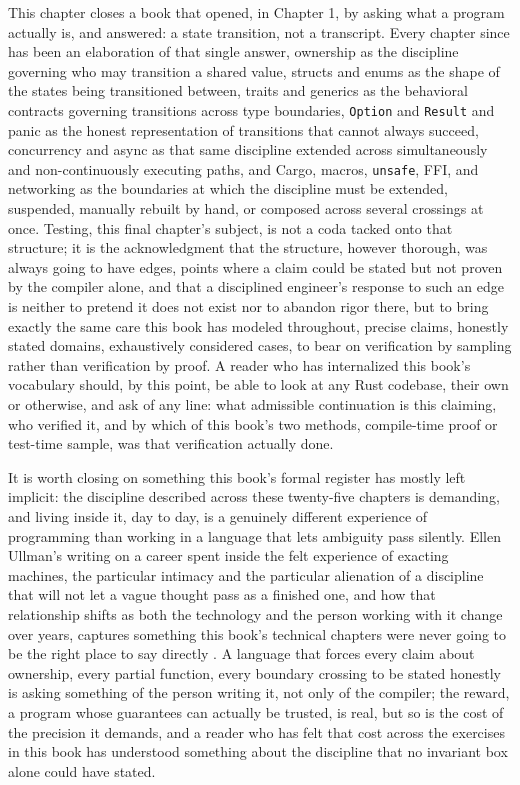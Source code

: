 \documentclass[11pt]{book}
\begin{document}
This chapter closes a book that opened, in Chapter 1, by asking what a program actually is, and answered: a state transition, not a transcript. Every chapter since has been an elaboration of that single answer, ownership as the discipline governing who may transition a shared value, structs and enums as the shape of the states being transitioned between, traits and generics as the behavioral contracts governing transitions across type boundaries, \texttt{Option} and \texttt{Result} and panic as the honest representation of transitions that cannot always succeed, concurrency and async as that same discipline extended across simultaneously and non-continuously executing paths, and Cargo, macros, \texttt{unsafe}, FFI, and networking as the boundaries at which the discipline must be extended, suspended, manually rebuilt by hand, or composed across several crossings at once. Testing, this final chapter's subject, is not a coda tacked onto that structure; it is the acknowledgment that the structure, however thorough, was always going to have edges, points where a claim could be stated but not proven by the compiler alone, and that a disciplined engineer's response to such an edge is neither to pretend it does not exist nor to abandon rigor there, but to bring exactly the same care this book has modeled throughout, precise claims, honestly stated domains, exhaustively considered cases, to bear on verification by sampling rather than verification by proof. A reader who has internalized this book's vocabulary should, by this point, be able to look at any Rust codebase, their own or otherwise, and ask of any line: what admissible continuation is this claiming, who verified it, and by which of this book's two methods, compile-time proof or test-time sample, was that verification actually done.

It is worth closing on something this book's formal register has mostly left implicit: the discipline described across these twenty-five chapters is demanding, and living inside it, day to day, is a genuinely different experience of programming than working in a language that lets ambiguity pass silently. Ellen Ullman's writing on a career spent inside the felt experience of exacting machines, the particular intimacy and the particular alienation of a discipline that will not let a vague thought pass as a finished one, and how that relationship shifts as both the technology and the person working with it change over years, captures something this book's technical chapters were never going to be the right place to say directly \cite{ullman2017}. A language that forces every claim about ownership, every partial function, every boundary crossing to be stated honestly is asking something of the person writing it, not only of the compiler; the reward, a program whose guarantees can actually be trusted, is real, but so is the cost of the precision it demands, and a reader who has felt that cost across the exercises in this book has understood something about the discipline that no invariant box alone could have stated.
\end{document}
